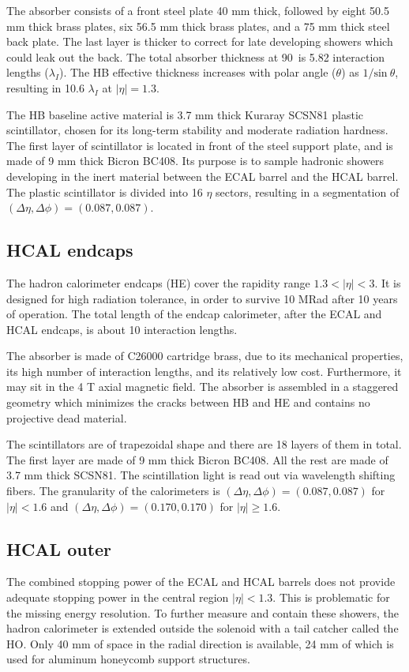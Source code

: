 The absorber consists of a front steel plate 40 mm thick,
followed by eight 50.5 mm thick brass plates, six 56.5 mm thick brass plates,
and a 75 mm thick steel back plate.
The last layer is thicker to correct for late developing showers which could leak out the back.
The total absorber thickness at 90\textdegree~is 5.82 interaction lengths ($\lambda_I$).
The HB effective thickness increases with polar angle ($\theta$) as $1/\textrm{sin}\:\theta$,
resulting in 10.6 $\lambda_I$ at $|\eta| = 1.3$. 

The HB baseline active material is 3.7 mm thick Kuraray SCSN81 plastic scintillator, 
chosen for its long-term stability and moderate radiation hardness. 
The first layer of scintillator is located in front of the steel support plate, 
and is made of 9 mm thick Bicron BC408. 
Its purpose is to sample hadronic showers developing in the inert material between
the ECAL barrel and the HCAL barrel.
The plastic scintillator is divided into 16 $\eta$ sectors, resulting in a segmentation of $(\Delta\eta, \Delta\phi) = (0.087, 0.087)$. 

\subsection{HCAL endcaps}

The hadron calorimeter endcaps (HE) cover the rapidity range $1.3 < |\eta| < 3$. 
It is designed for high radiation tolerance, in order to survive 10 MRad after 10 years of operation.
The total length of the endcap calorimeter, after the ECAL and HCAL endcaps, is about 10 interaction lengths. 

The absorber is made of C26000 cartridge brass, due to its mechanical properties, its high number of interaction lengths, and its relatively low cost.
Furthermore, it may sit in the 4 T axial magnetic field.
The absorber is assembled in a staggered geometry which minimizes the cracks between HB and HE and contains no projective dead material. 

The scintillators are of trapezoidal shape and there are 18 layers of them in total. 
The first layer are made of 9 mm thick Bicron BC408. All the rest are made of 3.7 mm thick SCSN81.
The scintillation light is read out via wavelength shifting fibers. 
The granularity of the calorimeters is $(\Delta\eta, \Delta\phi) = (0.087, 0.087)$ for $|\eta| < 1.6$ and $(\Delta\eta, \Delta\phi) = (0.170, 0.170)$ for $|\eta| \geq 1.6$.

\subsection{HCAL outer}
The combined stopping power of the ECAL and HCAL barrels does not provide adequate stopping
power in the central region $|\eta| < 1.3$. This is problematic for the missing energy resolution.
To further measure and contain these showers, the hadron calorimeter is extended outside the solenoid with a tail catcher called the HO. Only 40 mm of space in the radial direction is available, 
24 mm of which is used for aluminum honeycomb support structures.

